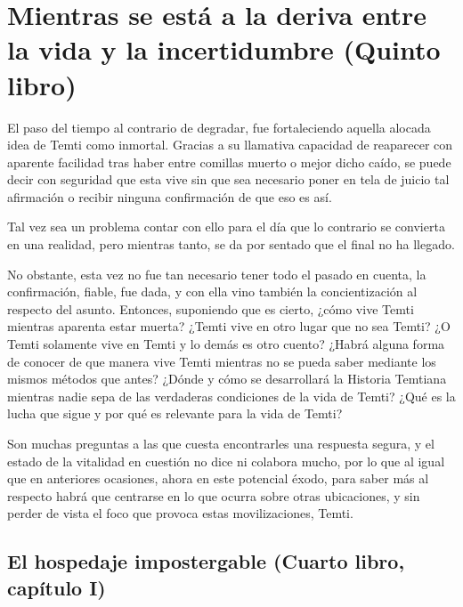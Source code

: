 \documentclass[
]{book}
\begin{document}
\hypertarget{mientras-se-estuxe1-a-la-deriva-entre-la-vida-y-la-incertidumbre-quinto-libro}{%
\chapter{Mientras se está a la deriva entre la vida y la incertidumbre (Quinto libro)}\label{mientras-se-estuxe1-a-la-deriva-entre-la-vida-y-la-incertidumbre-quinto-libro}}

El paso del tiempo al contrario de degradar, fue fortaleciendo aquella alocada idea de Temti como inmortal. Gracias a su llamativa capacidad de reaparecer con aparente facilidad tras haber entre comillas muerto o mejor dicho caído, se puede decir con seguridad que esta vive sin que sea necesario poner en tela de juicio tal afirmación o recibir ninguna confirmación de que eso es así.

Tal vez sea un problema contar con ello para el día que lo contrario se convierta en una realidad, pero mientras tanto, se da por sentado que el final no ha llegado.

No obstante, esta vez no fue tan necesario tener todo el pasado en cuenta, la confirmación, fiable, fue dada, y con ella vino también la concientización al respecto del asunto. Entonces, suponiendo que es cierto, ¿cómo vive Temti mientras aparenta estar muerta? ¿Temti vive en otro lugar que no sea Temti? ¿O Temti solamente vive en Temti y lo demás es otro cuento? ¿Habrá alguna forma de conocer de que manera vive Temti mientras no se pueda saber mediante los mismos métodos que antes? ¿Dónde y cómo se desarrollará la Historia Temtiana mientras nadie sepa de las verdaderas condiciones de la vida de Temti? ¿Qué es la lucha que sigue y por qué es relevante para la vida de Temti?

Son muchas preguntas a las que cuesta encontrarles una respuesta segura, y el estado de la vitalidad en cuestión no dice ni colabora mucho, por lo que al igual que en anteriores ocasiones, ahora en este potencial éxodo, para saber más al respecto habrá que centrarse en lo que ocurra sobre otras ubicaciones, y sin perder de vista el foco que provoca estas movilizaciones, Temti.

\hypertarget{el-hospedaje-impostergable-cuarto-libro-capuxedtulo-i}{%
\section{El hospedaje impostergable (Cuarto libro, capítulo I)}\label{el-hospedaje-impostergable-cuarto-libro-capuxedtulo-i}}
\end{document}
